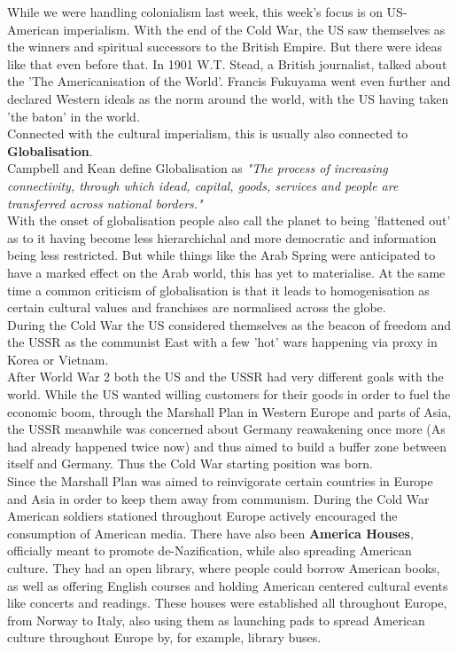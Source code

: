 \documentclass{article}
\begin{document}
	While we were handling colonialism last week, this week's focus is on US-American imperialism. With the end of the Cold War, the US saw themselves as the winners and spiritual successors to the British Empire. But there were ideas like that even before that. In 1901 W.T. Stead, a British journalist, talked about the 'The Americanisation of the World'. Francis Fukuyama went even further and declared Western ideals as the norm around the world, with the US having taken 'the baton' in the world. \\
	Connected with the cultural imperialism, this is usually also connected to \textbf{Globalisation}. \\
	Campbell and Kean define Globalisation as \textit{"The process of increasing connectivity, through which idead, capital, goods, services and people are transferred across national borders."}\\
	With the onset of globalisation people also call the planet to being 'flattened out' as to it having become less hierarchichal and more democratic and information being less restricted. But while things like the Arab Spring were anticipated to have a marked effect on the Arab world, this has yet to materialise. At the same time a common criticism of globalisation is that it leads to homogenisation as certain cultural values and franchises are normalised across the globe. \\
	During the Cold War the US considered themselves as the beacon of freedom and the USSR as the communist East with a few 'hot' wars happening via proxy in Korea or Vietnam. \\
	After World War 2 both the US and the USSR had very different goals with the world. While the US wanted willing customers for their goods in order to fuel the economic boom, through the Marshall Plan in Western Europe and parts of Asia, the USSR meanwhile was concerned about Germany reawakening once more (As had already happened twice now) and thus aimed to build a buffer zone between itself and Germany. Thus the Cold War starting position was born. \\
	Since the Marshall Plan was aimed to reinvigorate certain countries in Europe and Asia in order to keep them away from communism. During the Cold War American soldiers stationed throughout Europe actively encouraged the consumption of American media. There have also been \textbf{America Houses}, officially meant to promote de-Nazification, while also spreading American culture. They had an open library, where people could borrow American books, as well as offering English courses and holding American centered cultural events like concerts and readings. These houses were established all throughout Europe, from Norway to Italy, also using them as launching pads to spread American culture throughout Europe by, for example, library buses.
\end{document}
